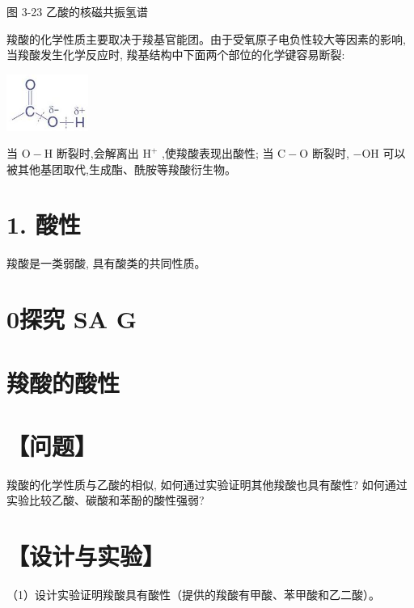 \documentclass[10pt]{article}
\begin{document}
图 3-23 乙酸的核磁共振氢谱

羧酸的化学性质主要取决于羧基官能团。由于受氧原子电负性较大等因素的影响, 当羧酸发生化学反应时, 羧基结构中下面两个部位的化学键容易断裂:

\begin{center}
\includegraphics[max width=0.2\textwidth]{images/0190efc5-b58a-7c43-bfb0-e0a030df9cfd_79_357451.jpg}
\end{center}

当 \(\mathrm{O} - \mathrm{H}\) 断裂时,会解离出 \({\mathrm{H}}^{ + }\) ,使羧酸表现出酸性; 当 \(\mathrm{C} - \mathrm{O}\) 断裂时, \(- \mathrm{{OH}}\) 可以被其他基团取代,生成酯、酰胺等羧酸衍生物。

\section*{1. 酸性}

羧酸是一类弱酸, 具有酸类的共同性质。

\section*{0探究 SA G}

\section*{羧酸的酸性}

\section*{【问题】}

羧酸的化学性质与乙酸的相似, 如何通过实验证明其他羧酸也具有酸性? 如何通过实验比较乙酸、碳酸和苯酚的酸性强弱?

\section*{【设计与实验】}

（1）设计实验证明羧酸具有酸性（提供的羧酸有甲酸、苯甲酸和乙二酸）。

\begin{center}
\end{center}
\end{document}
